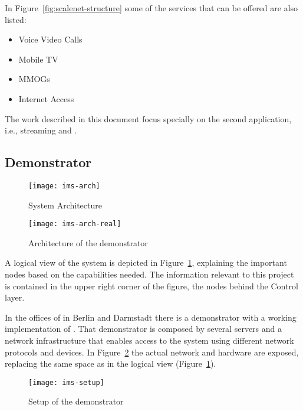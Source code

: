 In Figure~\ref{fig:scalenet-structure} some of the services that can be offered are also listed:

\begin{itemize}
  \item Voice \et{} Video Calls
  \item Mobile TV \et{} 
  \item {}\acp{MMOG}
  \item Internet Access
\end{itemize}

The work described in this document focus specially on the second application, i.e., streaming and .



\subsection{ Demonstrator} %
\label{sub:demonstrator}

\begin{figure}[p]
  \centering
    \texttt{[image: ims-arch]}
  \caption{System Architecture}
  \label{fig:ims-arch}
\end{figure}

\begin{figure}[p]
  \centering
    \texttt{[image: ims-arch-real]}
  \caption{Architecture of the demonstrator}
  \label{fig:ims-arch-real}
\end{figure}

A logical view of the system is depicted in Figure~\ref{fig:ims-arch}, explaining the important nodes based on the capabilities needed. The information relevant to this project is contained in the upper right corner of the figure, the nodes behind the Control layer.

In the offices of  in Berlin and Darmstadt there is a demonstrator with a working implementation of . That demonstrator is composed by several servers and a network infrastructure that enables access to the system using different network protocols and devices. In Figure~\ref{fig:ims-arch-real} the actual network and hardware are exposed, replacing the same space as in the logical view (Figure~\ref{fig:ims-arch}).

\begin{figure}[htbp]
  \centering
    \texttt{[image: ims-setup]}
  \caption{Setup of the demonstrator}
  \label{fig:ims-setup}
\end{figure}

